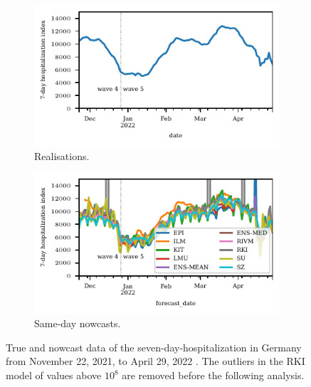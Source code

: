 \begin{figure}
    \centering
    \begin{subfigure}[t]{0.48\textwidth}
    \includegraphics{plots/covid_nowcast/00_true_data.pdf}
    \caption{Realisations.}
    \label{fig:app-covid-true}
    \end{subfigure}\hfill
    \begin{subfigure}[t]{0.48\textwidth}
    \includegraphics{plots/covid_nowcast/00_nowcast_data.pdf}
    \caption{Same-day nowcasts. }
    \label{fig:app-covid-nowcast}
        \end{subfigure}
    \caption{True and nowcast data of the seven-day-hospitalization in Germany from November 22, 2021, to April 29, 2022 \parencite{ChairOfEconometricsAndStatisticsAtKarlsruheInstituteOfTechnology2024}.
    The outliers in the RKI model of values above $10^8$ are removed before the following analysis.}
    \label{fig:app-covid-true-nowcast}
\end{figure}


